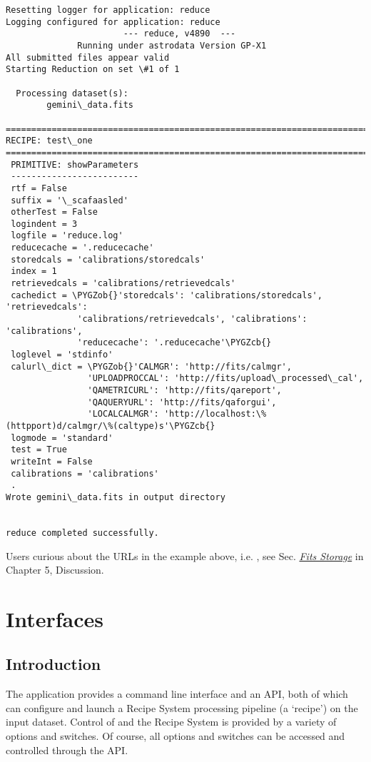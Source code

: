 \documentclass[letterpaper,10pt,english]{sphinxmanual}
\def\PYGZob{\char`\{}
\def\PYGZcb{\char`\}}
\begin{document}
\begin{Verbatim}[commandchars=\\\{\}]
Resetting logger for application: reduce
Logging configured for application: reduce
                       --- reduce, v4890  ---
              Running under astrodata Version GP-X1
All submitted files appear valid
Starting Reduction on set \#1 of 1

  Processing dataset(s):
        gemini\_data.fits

==============================================================================
RECIPE: test\_one
==============================================================================
 PRIMITIVE: showParameters
 -------------------------
 rtf = False
 suffix = '\_scafaasled'
 otherTest = False
 logindent = 3
 logfile = 'reduce.log'
 reducecache = '.reducecache'
 storedcals = 'calibrations/storedcals'
 index = 1
 retrievedcals = 'calibrations/retrievedcals'
 cachedict = \PYGZob{}'storedcals': 'calibrations/storedcals', 'retrievedcals':
              'calibrations/retrievedcals', 'calibrations': 'calibrations',
              'reducecache': '.reducecache'\PYGZcb{}
 loglevel = 'stdinfo'
 calurl\_dict = \PYGZob{}'CALMGR': 'http://fits/calmgr',
                'UPLOADPROCCAL': 'http://fits/upload\_processed\_cal',
                'QAMETRICURL': 'http://fits/qareport',
                'QAQUERYURL': 'http://fits/qaforgui',
                'LOCALCALMGR': 'http://localhost:\%(httpport)d/calmgr/\%(caltype)s'\PYGZcb{}
 logmode = 'standard'
 test = True
 writeInt = False
 calibrations = 'calibrations'
 .
Wrote gemini\_data.fits in output directory


reduce completed successfully.
\end{Verbatim}

Users curious about the URLs in the example above, i.e. , see
Sec. {\hyperref[discuss:fitsstore]{\emph{Fits Storage}}} in Chapter 5, Discussion.


\chapter{Interfaces}
\label{interfaces:interfaces}\label{interfaces::doc}

\section{Introduction}
\label{interfaces:introduction}
The  application provides a command line interface and an API, both
of which can configure and launch a Recipe System processing pipeline (a `recipe')
on the input dataset. Control of  and the Recipe System is provided
by a variety of options and switches. Of course, all options and switches
can be accessed and controlled through the API.
\end{document}
